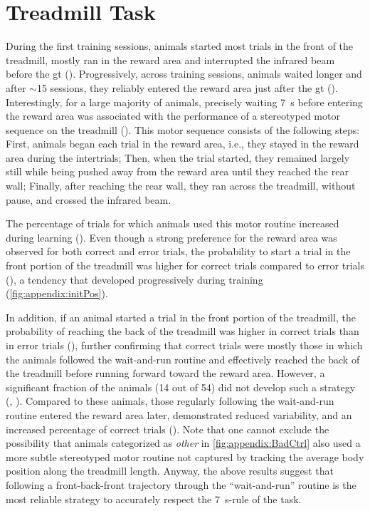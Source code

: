 \section{Treadmill Task}
\label{ch:time:treadmill}
During the first training sessions, animals started most trials in the front of the treadmill, mostly ran in the reward area and interrupted the infrared beam before the \gls{gt} ().
Progressively, across training sessions, animals waited longer and after $\sim$15 sessions, they reliably entered the reward area just after the \gls{gt} ().
Interestingly, for a large majority of animals, precisely waiting 7~s before entering the reward area was associated with the performance of a stereotyped motor sequence on the treadmill ().
This motor sequence consists of the following steps:
    First, animals began each trial in the reward area, i.e., they stayed in the reward area during the intertrials;
    Then, when the trial started, they remained largely still while being pushed away from the reward area until they reached the rear wall;
    Finally, after reaching the rear wall, they ran across the treadmill, without pause, and crossed the infrared beam.

The percentage of trials for which animals used this motor routine increased during learning ().
Even though a strong preference for the reward area was observed for both correct and error trials, the probability to start a trial in the front portion of the treadmill was higher for correct trials compared to error trials (), a tendency that developed progressively during training (\autoref{fig:appendix:initPos}).
\par
In addition, if an animal started a trial in the front portion of the treadmill, the probability of reaching the back of the treadmill was higher in correct trials than in error trials (), further confirming that correct trials were mostly those in which the animals followed the wait-and-run routine and effectively reached the back of the treadmill before running forward toward the reward area.
However, a significant fraction of the animals (14 out of 54) did not develop such a strategy (, ).
Compared to these animals, those regularly following the wait-and-run routine entered the reward area later, demonstrated reduced variability, and an increased percentage of correct trials ().
Note that one cannot exclude the possibility that animals categorized as \textit{other} in \autoref{fig:appendix:BadCtrl} also used a more subtle stereotyped motor routine not captured by tracking the average body position along the treadmill length.
Anyway, the above results suggest that following a front-back-front trajectory through the ``wait-and-run'' routine is the most reliable strategy to accurately respect the 7~s-rule of the task.



